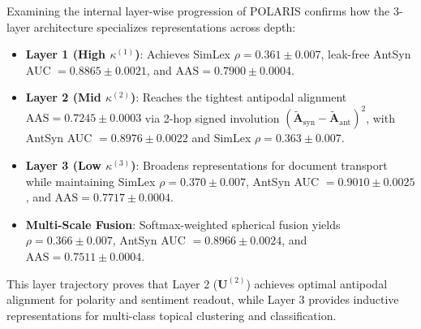 \documentclass[journal]{IEEEtran}
\begin{document}
Examining the internal layer-wise progression of POLARIS confirms how the 3-layer architecture specializes representations across depth:
\begin{itemize}
    \item \textbf{Layer 1 (High $\kappa^{(1)}$)}: Achieves SimLex $\rho = 0.361 \pm 0.007$, leak-free AntSyn AUC $= 0.8865 \pm 0.0021$, and $\text{AAS} = 0.7900 \pm 0.0004$.
    \item \textbf{Layer 2 (Mid $\kappa^{(2)}$)}: Reaches the tightest antipodal alignment $\text{AAS} = \mathbf{0.7245 \pm 0.0003}$ via 2-hop signed involution $(\tilde{\mathbf{A}}_{\text{syn}} - \tilde{\mathbf{A}}_{\text{ant}})^2$, with AntSyn AUC $= 0.8976 \pm 0.0022$ and SimLex $\rho = 0.363 \pm 0.007$.
    \item \textbf{Layer 3 (Low $\kappa^{(3)}$)}: Broadens representations for document transport while maintaining SimLex $\rho = 0.370 \pm 0.007$, AntSyn AUC $= 0.9010 \pm 0.0025$, and $\text{AAS} = 0.7717 \pm 0.0004$.
    \item \textbf{Multi-Scale Fusion}: Softmax-weighted spherical fusion yields $\rho = 0.366 \pm 0.007$, AntSyn AUC $= 0.8966 \pm 0.0024$, and $\text{AAS} = 0.7511 \pm 0.0004$.
\end{itemize}
This layer trajectory proves that Layer 2 ($\mathbf{U}^{(2)}$) achieves optimal antipodal alignment for polarity and sentiment readout, while Layer 3 provides inductive representations for multi-class topical clustering and classification.
\end{document}
